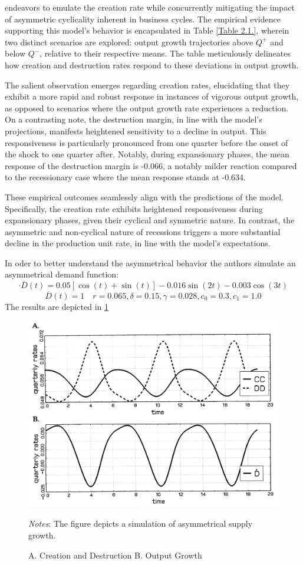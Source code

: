 \documentclass[12pt]{article}
\begin{document}
endeavors to emulate the creation rate while concurrently mitigating the impact of asymmetric cyclicality inherent in
business cycles. The empirical evidence supporting this model's behavior is encapsulated in Table \ref{Table 2.1.},
wherein two distinct scenarios are explored: output growth trajectories above \(Q^+\) and below \(Q^-\), relative to
their respective means. The table meticulously delineates how creation and destruction rates respond to these deviations
in output growth. 
\par
The salient observation emerges regarding creation rates, elucidating that they exhibit a more rapid and robust response
in instances of vigorous output growth, as opposed to scenarios where the output growth rate experiences a reduction. On
a contrasting note, the destruction margin, in line with the model's projections, manifests heightened sensitivity to a
decline in output. This responsiveness is particularly pronounced from one quarter before the onset of the shock to one
quarter after. Notably, during expansionary phases, the mean response of the destruction margin is -0.066, a notably
milder reaction compared to the recessionary case where the mean response stands at -0.634. 
\par
These empirical outcomes seamlessly align with the predictions of the model. Specifically, the creation rate exhibits
heightened responsiveness during expansionary phases, given their cyclical and symmetric nature. In contrast, the
asymmetric and non-cyclical nature of recessions triggers a more substantial decline in the production unit rate, in
line with the model's expectations. 
\par 
In oder to better understand the asymmetrical behavior the authors simulate an asymmetrical demand function:
\[\cdot{\overline{D}}(t)=0.05[\cos(t)+\sin(t)] - 0.016 \sin(2t)-0.003\cos(3t)\]
\[\overline{D}(t)=1\quad r = 0.065, \delta =0.15, \gamma=0.028, c_0=0.3, c_1=1.0\] 
The results are depicted in \ref{plot:2.4}
\begin{figure}
    \centering
    \includegraphics[scale = 0.4]{Plot2.4.png}
    \caption{A.  Creation and  Destruction B. Output Growth}
    \label{plot:2.4}
    \footnotesize \textit{Notes}: The figure depicts a simulation of asymmetrical supply growth.
\end{figure}
\end{document}
